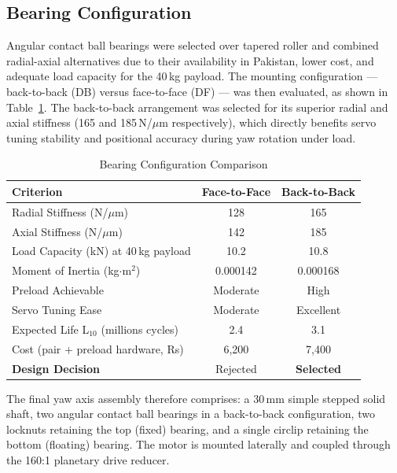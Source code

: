 \subsection{Bearing Configuration}

Angular contact ball bearings were selected over tapered roller and 
combined radial-axial alternatives due to their availability in Pakistan, 
lower cost, and adequate load capacity for the 40\,kg payload. The 
mounting configuration --- back-to-back (DB) versus face-to-face (DF) 
--- was then evaluated, as shown in Table~\ref{tab:yaw_bearing_config}. 
The back-to-back arrangement was selected for its superior radial and 
axial stiffness (165 and 185\,N/$\mu$m respectively), which directly 
benefits servo tuning stability and positional accuracy during yaw 
rotation under load.

\begin{table}[htbp]
    \centering
    \small
    \caption{Bearing Configuration Comparison}
    \label{tab:yaw_bearing_config}
    \begin{tabular}{l c c}
        \toprule
        \textbf{Criterion} & \textbf{Face-to-Face} & \textbf{Back-to-Back} \\
        \midrule
        Radial Stiffness (N/\(\mu\)m) & 128 & 165 \\
        Axial Stiffness (N/\(\mu\)m) & 142 & 185 \\
        Load Capacity (kN) at 40\,kg payload & 10.2 & 10.8 \\
        Moment of Inertia (kg\(\cdot\)m\(^2\)) & 0.000142 & 0.000168 \\
        Preload Achievable & Moderate & High \\
        Servo Tuning Ease & Moderate & Excellent \\
        Expected Life L\(_{10}\) (millions cycles) & 2.4 & 3.1 \\
        Cost (pair + preload hardware, Rs) & 6,200 & 7,400 \\
        \textbf{Design Decision} & Rejected & \textbf{Selected} \\
        \bottomrule
    \end{tabular}
\end{table}

The final yaw axis assembly therefore comprises: a 30\,mm simple stepped 
solid shaft, two angular contact ball bearings in a back-to-back 
configuration, two locknuts retaining the top (fixed) bearing, and a 
single circlip retaining the bottom (floating) bearing. The motor is 
mounted laterally and coupled through the 160:1 planetary drive reducer.

